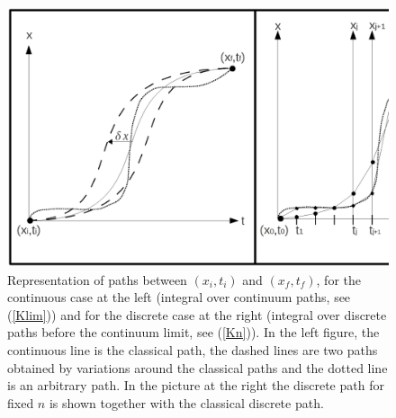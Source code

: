 \documentclass[12pt,aps,prb,preprint]{revtex4-1}   %
\begin{document}
\begin{figure}
 \centering
\includegraphics[width=130mm]{Fig0.ps}
\caption{\label{Fig.0} Representation of paths between $(x_i,t_i)$ and $(x_f,t_f)$, 
for the continuous case at the left (integral over continuum paths, see (\ref{Klim})) 
and for the discrete case at the right (integral over discrete paths before the continuum limit, see (\ref{Kn})).
In the left figure, the continuous line is the classical path, 
the dashed lines are two paths obtained by variations around the classical paths
and the dotted line is an arbitrary path.
In the picture at the right the discrete path for fixed $n$ is shown together 
with the classical discrete path.} 
\end{figure}
\end{document}
